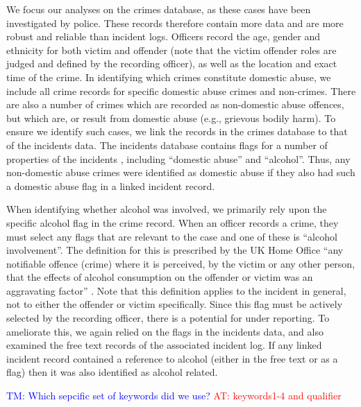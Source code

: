 \documentclass[12pt, a4paper]{article}
\newcommand{\AT}[1]{\textcolor{red}{AT: #1}}
\newcommand{\TM}[1]{\textcolor{blue}{TM: #1}}
\begin{document}
We focus our analyses on the crimes database, as these cases have been investigated by police. These records therefore contain more data and are more robust and reliable than incident logs. Officers record the age, gender and ethnicity for both victim and offender (note that the victim offender roles are judged and defined by the recording officer), as well as the location and exact time of the crime. 
In identifying which crimes constitute domestic abuse, we include all crime records for specific domestic abuse crimes and non-crimes. There are also a number of crimes which are recorded as non-domestic abuse offences, but which are, or result from domestic abuse (e.g., grievous bodily harm). To ensure we identify such cases, we link the records in the crimes database to that of the incidents data. The incidents database contains flags for a number of properties of the incidents , including ``domestic abuse'' and ``alcohol''. Thus, any non-domestic abuse crimes were identified as domestic abuse if they also had such a domestic abuse flag in a linked incident record.

When identifying whether alcohol was involved, we primarily rely upon the specific alcohol flag in the crime record. When an officer records a crime, they must select any flags that are relevant to the case and one of these is ``alcohol involvement''. The definition for this is prescribed by the UK Home Office ``any notifiable offence (crime) where it is perceived, by the victim or any other person, that the effects of alcohol consumption on the offender or victim was an aggravating factor'' \cite{Office2019}. Note that this definition applies to the incident in general, not to either the offender or victim specifically. Since this flag must be actively selected by the recording officer, there is a potential for under reporting. To ameliorate this, we again relied on the flags in the incidents data, and also examined the free text records of the associated incident log. If any linked incident record contained a reference to alcohol (either in the free text or as a flag) then it was also identified as alcohol related.
 
 \TM{Which sepcific set of keywords did we use?} \AT{keywords1-4 and qualifier}
 
 
\end{document}
